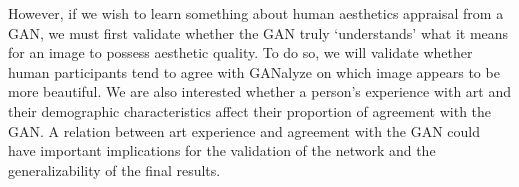 \documentclass[../main.tex]{subfiles}
\begin{document}

However, if we wish to learn something about human aesthetics appraisal from a GAN, we must first validate whether the GAN truly `understands' what it means for an image to possess aesthetic quality. To do so, we will validate whether human participants tend to agree with GANalyze on which image appears to be more beautiful. We are also interested whether a person's experience with art and their demographic characteristics affect their proportion of agreement with the GAN. A relation between art experience and agreement with the GAN could have important implications for the validation of the network and the generalizability of the final results.
\end{document}

